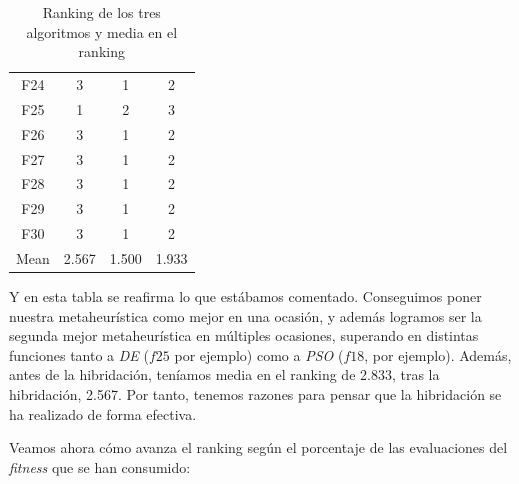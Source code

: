 \documentclass[11pt]{article}
\begin{document}
\begin{table}[H]
\begin{tabular}{|c|c|c|c|}
F24  &             3 &      1 &      2 \\
F25  &             1 &      2 &      3 \\
F26  &             3 &      1 &      2 \\
F27  &             3 &      1 &      2 \\
F28  &             3 &      1 &      2 \\
F29  &             3 &      1 &      2 \\
F30  &             3 &      1 &      2 \\
Mean &         2.567 &  1.500 &  1.933 \\
\hline
\end{tabular}
    \caption{Ranking de los tres algoritmos y media en el ranking}
\end{table}

Y en esta tabla se reafirma lo que estábamos comentado. Conseguimos poner nuestra metaheurística como mejor en una ocasión, y además logramos ser la segunda mejor metaheurística en múltiples ocasiones, superando en distintas funciones tanto a \emph{DE} ($f25$ por ejemplo) como a \emph{PSO} ($f18$, por ejemplo). Además, antes de la hibridación, teníamos media en el ranking de 2.833, tras la hibridación, 2.567. Por tanto, tenemos razones para pensar que la hibridación se ha realizado de forma efectiva.

Veamos ahora cómo avanza el ranking según el porcentaje de las evaluaciones del \emph{fitness} que se han consumido:

\begin{table}[H]
\centering
{}
    \caption{Ranking según el avance del porcentaje de evaluaciones consumidas}
\end{table}
\end{document}

